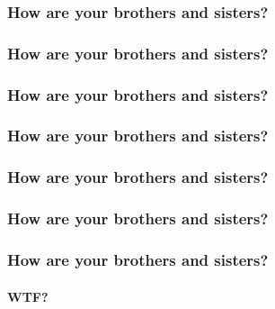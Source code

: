 \documentclass[fleqn]{report}
\begin{document}
\subsubsection{How are your brothers and sisters?}
\subsubsection{How are your brothers and sisters?}
\subsubsection{How are your brothers and sisters?}
\subsubsection{How are your brothers and sisters?}
\subsubsection{How are your brothers and sisters?}
\subsubsection{How are your brothers and sisters?}
\subsubsection{How are your brothers and sisters?}
\paragraph*{WTF?}
\end{document}
